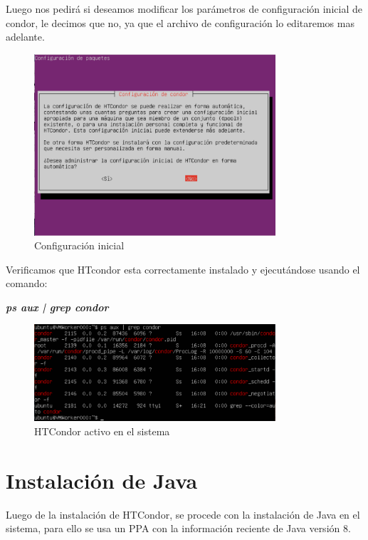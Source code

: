 Luego nos pedirá si deseamos modificar los parámetros de configuración inicial de condor, le decimos que no, ya que el archivo de configuración lo editaremos mas adelante.

\begin{figure}[h]
\centering
\includegraphics[width=0.8\textwidth]{Figures/preconf.png}
\decoRule
\caption{Configuración inicial}
\label{fig:htcondor pre-conf}
\end{figure}
\FloatBarrier

Verificamos que HTcondor esta correctamente instalado y ejecutándose usando el comando:

\textbf{\textit{ps aux | grep condor}}

\begin{figure}[h]
\centering
\includegraphics[width=0.8\textwidth]{Figures/running.png}
\decoRule
\caption{HTCondor activo en el sistema}
\label{fig:htcondor pre-conf}
\end{figure}
\FloatBarrier

\section{Instalación de Java}

Luego de la instalación de HTCondor, se procede con la instalación de Java en el sistema, para ello se usa un PPA con la información reciente de Java versión 8.

